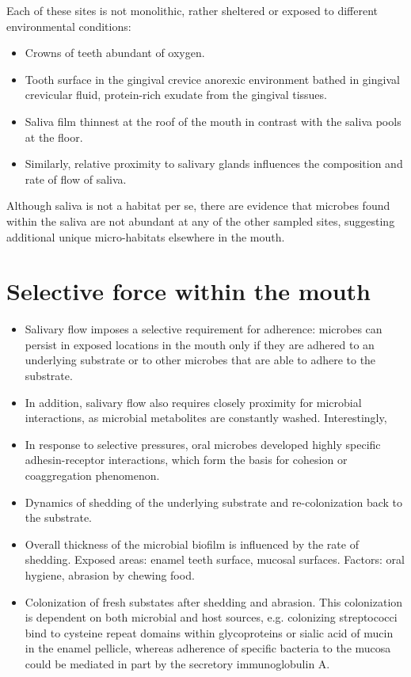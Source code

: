 Each of these sites is not monolithic, rather sheltered or exposed to different environmental conditions: 
\begin{itemize}
    \item Crowns of teeth abundant of oxygen.
    \item Tooth surface in the gingival crevice anorexic environment bathed in gingival crevicular fluid, protein-rich 
    exudate from the gingival tissues. 
    \item Saliva film thinnest at the roof of the mouth in contrast with the saliva pools at the floor. 
    \item Similarly, relative proximity to salivary glands influences the composition and rate of flow of saliva. 
\end{itemize}

Although saliva is not a habitat per se, there are evidence that microbes found within the saliva are not abundant at 
any of the other sampled sites, suggesting additional unique micro-habitats elsewhere in the mouth. 

\section{Selective force within the mouth}
\begin{itemize}[Flow and adhesion]
    \item Salivary flow imposes a selective requirement for adherence: microbes can persist in exposed locations in the 
    mouth only if they are adhered to an underlying substrate or to other microbes that are able to adhere to the substrate. 
    \item In addition, salivary flow also requires closely proximity for microbial interactions, as microbial metabolites 
    are constantly washed. Interestingly,  
    \item In response to selective pressures, oral microbes developed highly specific adhesin-receptor interactions, 
    which form the basis for cohesion or coaggregation phenomenon. 
\end{itemize}

\begin{itemize}[Shedding and colonization]
    \item Dynamics of shedding of the underlying substrate and re-colonization back to the substrate.
    \item Overall thickness of the microbial biofilm is influenced by the rate of shedding. Exposed areas: enamel teeth 
    surface, mucosal surfaces. Factors: oral hygiene, abrasion by chewing food. 
    \item Colonization of fresh substates after shedding and abrasion. This colonization is dependent on both microbial 
    and host sources, e.g. colonizing streptococci bind to cysteine repeat domains within glycoproteins or sialic acid of 
    mucin in the enamel pellicle, whereas adherence of specific bacteria to the mucosa could be mediated in part by the secretory 
    immunoglobulin A.
\end{itemize}

